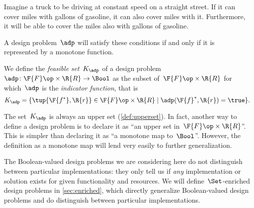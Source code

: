 \begin{example}
Imagine a truck to be driving at constant speed on a straight street. If it can cover \unit[100]{miles} with \unit[5]{gallons} of gasoline, it can also cover \unit[80]{miles} with it. Furthermore, it will be able to cover the \unit[100]{miles} also with \unit[10]{gallons} of gasoline.
\end{example}

A design problem~$\adp$ will satisfy these conditions if and only if it is represented by a monotone function. 
\begin{definition}
We define the \emph{feasible set}~$K_\adp$ of a design problem~$\adp\colon \F{F}\op \times \R{R}\to \Bool$ as the subset of~$\F{F} \op\times \R{R}$ for which~$\adp$ is the \emph{indicator function}, that is
\begin{equation}
    K_\adp = \{ \tup{\F{f^*},\R{r}} \in \F{F} \op\times \R{R}  \mid
            \adp(\F{f}^*, \R{r}) = \true
                \}.
\end{equation}
\end{definition}
\begin{remark}
The set~$K_\adp$ is always an upper set (\cref{def:upperset}). In fact, another way to define a design problem is to declare it as ``an upper
set in~$\F{F}\op \times \R{R}$''. This is simpler than declaring it as ``a monotone map to~$\Bool$''. However, the definition as a monotone map will lend very easily to further generalization.
\end{remark}
The Boolean-valued design problems we are considering here do not distinguish between particular implementations: they only tell us if \emph{any} implementation or solution exists for given functionality and resources. We will define~$\Set$-enriched design problems in \cref{sec:enriched}, which directly generalize Boolean-valued design problems and do distinguish between particular implementations.

